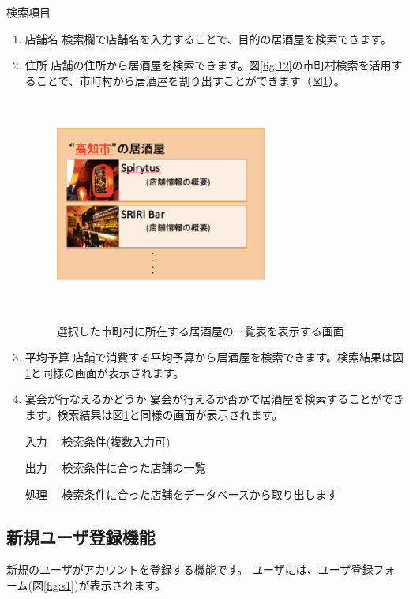 \documentclass[a4j,titlepage]{jarticle}
\begin{document}
検索項目
\begin{enumerate}
\item 店舗名
検索欄で店舗名を入力することで、目的の居酒屋を検索できます。

\item 住所
店舗の住所から居酒屋を検索できます。図\ref{fig:12}の市町村検索を活用することで、市町村から居酒屋を割り出すことができます（図\ref{fig:13}）。

\begin {figure}[htbp]
    \begin{center}
    \includegraphics [height=7cm, width=7cm]{extrnal_design_document_image/13.eps}
　　    \caption {選択した市町村に所在する居酒屋の一覧表を表示する画面}
    \label {fig:13}
    \end{center}
\end {figure}

\item 平均予算
店舗で消費する平均予算から居酒屋を検索できます。検索結果は図\ref{fig:13}と同様の画面が表示されます。


\item 宴会が行なえるかどうか
宴会が行えるか否かで居酒屋を検索することができます。検索結果は図\ref{fig:13}と同様の画面が表示されます。

\end{enumerate}

\begin{enumerate}
\item [入力]　検索条件(複数入力可)
\item [出力]　検索条件に合った店舗の一覧
\item [処理]　検索条件に合った店舗をデータベースから取り出します
\end{enumerate}


\subsection{新規ユーザ登録機能}
新規のユーザがアカウントを登録する機能です。
ユーザには、ユーザ登録フォーム(図\ref{fig:s1})が表示されます。
\end{document}
